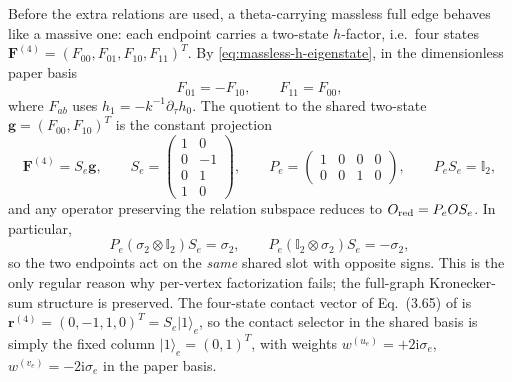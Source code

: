 \documentclass[11pt,a4paper]{article}
\newcommand{\ii}{\mathrm i}
\newcommand{\Id}{\mathbb I}
\begin{document}
Before the extra relations are used, a theta-carrying massless full edge behaves like a massive one:
each endpoint carries a two-state $h$-factor, i.e.\ four states
$\bm F^{(4)}=(F_{00},F_{01},F_{10},F_{11})^T$. By \eqref{eq:massless-h-eigenstate}, in the
dimensionless paper basis
\begin{equation}
  F_{01}=-F_{10},
  \qquad
  F_{11}=F_{00},
  \label{eq:h-state-massless-relations}
\end{equation}
where $F_{ab}$ uses $h_1=-k^{-1}\partial_\tau h_0$. The quotient to the shared two-state
$\bm g=(F_{00},F_{10})^T$ is the constant projection
\begin{equation}
  \bm F^{(4)}=S_e\bm g,
  \qquad
  S_e=
  \begin{pmatrix}1&0\\0&-1\\0&1\\1&0\end{pmatrix},
  \qquad
  P_e=
  \begin{pmatrix}1&0&0&0\\0&0&1&0\end{pmatrix},
  \qquad
  P_eS_e=\Id_2,
  \label{eq:SP-massless}
\end{equation}
and any operator preserving the relation subspace reduces to $O_{\rm red}=P_eOS_e$. In particular,
\begin{equation}
  P_e(\sigma_2\otimes\Id_2)S_e=\sigma_2,
  \qquad
  P_e(\Id_2\otimes\sigma_2)S_e=-\sigma_2,
\end{equation}
so the two endpoints act on the \emph{same} shared slot with opposite signs. This is the only
regular reason why per-vertex factorization fails; the full-graph Kronecker-sum structure is
preserved. The four-state contact vector of Eq.~(3.65) of \citet{Chen:2023eic} is
$\bm r^{(4)}=(0,-1,1,0)^T=S_e|1\rangle_e$, so the contact selector in the shared basis is simply the
fixed column $|1\rangle_e=(0,1)^T$, with weights $w^{(u_e)}=+2\ii\sigma_e$,
$w^{(v_e)}=-2\ii\sigma_e$ in the paper basis.
\end{document}
